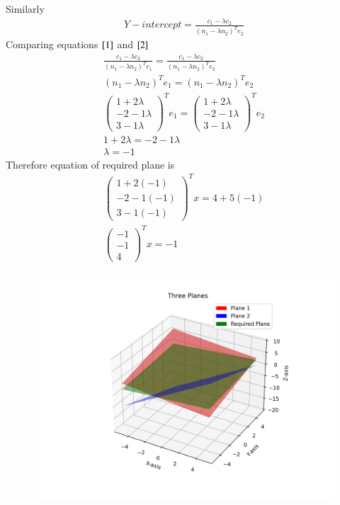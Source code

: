 \documentclass[journal]{IEEEtran}
\begin{document}
Similarly
\begin{align}
    Y-intercept=\frac{c_1-\lambda c_2}{(n_1-\lambda n_2)^Te_2} \label{2}
\end{align}
\newpage
Comparing equations $\eqref{1}$ and $\eqref{2}$
\begin{align}
    \frac{c_1-\lambda c_2}{(n_1-\lambda n_2)^Te_1}=\frac{c_1-\lambda c_2}{(n_1-\lambda n_2)^Te_2}\\
    (n_1-\lambda n_2)^Te_1=(n_1-\lambda n_2)^Te_2\\
    \begin{pmatrix}1+2\lambda\\-2-1\lambda\\3-1\lambda\end{pmatrix}^Te_1=\begin{pmatrix}1+2\lambda\\-2-1\lambda\\3-1\lambda\end{pmatrix}^Te_2\\
    1+2\lambda=-2-1\lambda\\
    \lambda=-1
\end{align}
Therefore equation of required plane is
\begin{align}
    \begin{pmatrix}1+2(-1)\\-2-1(-1)\\3-1(-1)\end{pmatrix}^Tx=4+5(-1)\\
    \begin{pmatrix}-1\\-1\\4\end{pmatrix}^Tx=-1
\end{align}
\begin{figure}[H]
    \centering
    \includegraphics[width=\columnwidth]{figs/Figure.png}
    \caption{}
    \label{fig:placeholder}
\end{figure}
\end{document}
